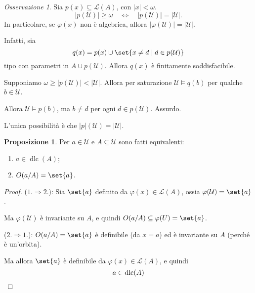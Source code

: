 \documentclass[10pt]{article}
\newcommand{\card}[1]{\left\vert #1 \right\vert}
\newcommand{\1}{\mathds{1}}
\theoremstyle{definition}%
\newtheorem{prop}[thm]{Proposizione}
\theoremstyle{plain}
\theoremstyle{remark}
\newtheorem*{oss}{Osservazione}
\begin{document}
\begin{oss}
Sia \(p(x) \subseteq \mathcal{L}(A)\), con \(\card{x}<\omega\).
\begin{equation*}
\card{p(\mathcal{U})}\ge\omega\quad\iff\quad \card{p(\mathcal{U})}=\card{\mathcal{U}}.
\end{equation*}
In particolare, se \(\varphi(x)\) non è algebrica, allora \(\card{\varphi(\mathcal{U})}=\card{\mathcal{U}}\).

Infatti, sia
\begin{equation*}
q(x)=p(x) \cup\set{x\neq d\mid d \in p(\mathcal{U})}
\end{equation*}
tipo con parametri in \(A \cup p(\mathcal{U})\). Allora \(q(x)\) è finitamente soddisfacibile.

Supponiamo \(\omega\ge \card{p(\mathcal{U})} < \card{\mathcal{U}}\). Allora per saturazione \(\mathcal{U}\vDash q(b)\) per qualche \(b \in \mathcal{U}\).

Allora \(\mathcal{U}\vDash p(b)\), ma \(b\neq d\) per ogni \(d \in p(\mathcal{U})\). Assurdo.

L'unica possibilità è che \(\card{p}(\mathcal{U})=\card{\mathcal{U}}\).
\end{oss}
\begin{prop}
Per \(a \in \mathcal{U}\) e \(A \subseteq \mathcal{U}\) sono fatti equivalenti:
\begin{enumerate}
\item \(a \in \operatorname{dlc}(A)\);
\item \(O(a/A) =\set{a}\).
\end{enumerate}
\end{prop}
\begin{proof}
(\(1.\Rightarrow 2.\)): Sia \(\set{a}\) definito da \(\varphi(x) \in \mathcal{L}(A)\), ossia \(\varphi(\mathcal{U})=\set{a}\).

Ma \(\varphi(\mathcal{U})\) è invariante su \(A\), e quindi \(O(a/A) \subseteq \varphi(U)=\set{a}\).

(\(2.\Rightarrow 1.\)): \(O(a/A)=\set{a}\) è definibile (da \(x=a\)) ed è invariante su \(A\) (perché è un'orbita).

Ma allora \(\set{a}\) è definibile da \(\varphi(x) \in \mathcal{L}(A)\), e quindi
\begin{equation*}
a \in \operatorname{dlc}(A)\qedhere
\end{equation*}
\end{proof}
\end{document}
